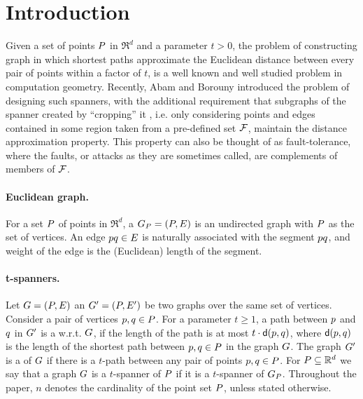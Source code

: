 \documentclass[12pt]{article}%
\begin{document}

\section{Introduction}

Given a set of points $P$ in $\Re^d$ and a parameter $t>0$, the problem of constructing graph in which shortest paths approximate the Euclidean distance between every pair of points within a factor of $t$, is a well known and well studied problem in computation geometry. Recently, Abam and Borouny \cite{ab-lgs-21} introduced the problem of designing such spanners, with the additional requirement that subgraphs of the spanner created by ``cropping'' it , i.e. only considering points and edges contained in some region taken from a pre-defined set $\mathcal{F}$, maintain the distance approximation property. This property can also be thought of as fault-tolerance, where the faults, or attacks as they are sometimes called, are complements of members of $\mathcal{F}$.


\paragraph{Euclidean graph.}
For a set $P$ of points in $\Re^d$, a 
$G_P = (P, E)$ is an undirected graph with $P$ as the set of
vertices. An edge $p q \in E$ is naturally associated with the
segment $pq$, and weight of the edge is the (Euclidean) length of
the segment.


\paragraph{t-spanners.}
Let $G=(P,E)$ an $G'=(P,E')$ be two graphs over the same set of vertices. Consider a pair of vertices $p,q \in P$. For a
parameter $t \geq 1$, a path between $p$ and $q$ in $G'$ is a
 w.r.t. $G$, if the length of the path is at most
$t \cdot \dGY{\pa}{\pb}$, where $\dGY{\pa}{\pb}$ is the length
of the shortest path between $p,q\in P$ in the graph $G$.
The graph $G'$ is a  of
$G$ if there is a $t$-path between any pair of points $p,q\in P$.
For $P\subseteq \mathbb{R}^d$ we say that a graph $G$ is a $t$-spanner of $P$ if it is a $t$-spanner of $G_P$. Throughout the paper, $n$ denotes the cardinality of the point set $P$, unless stated otherwise. 
\end{document}
